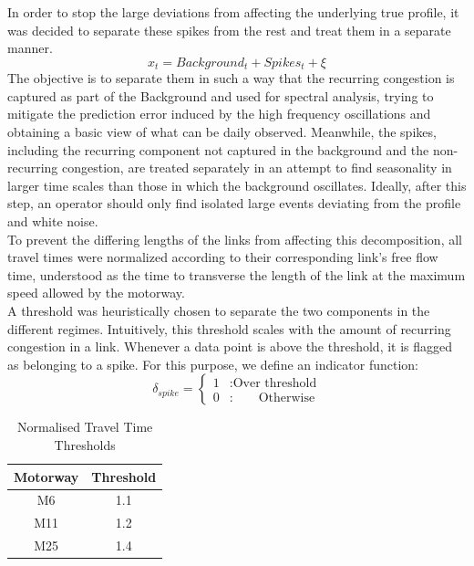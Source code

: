 \documentclass[conference]{IEEEtran}
\begin{document}
In order to stop the large deviations from affecting the underlying true profile, it was decided to separate these spikes from the rest and treat them in a separate manner.
\begin{equation}
x_t = Background_t + Spikes_t + \xi
\end{equation}
The objective is to separate them in such a way that the recurring congestion is captured as part of the Background and used for spectral analysis, trying to mitigate the prediction error induced by the high frequency oscillations and obtaining a basic view of what can be daily observed. 
Meanwhile, the spikes, including the recurring component not captured in the background and the non-recurring congestion, are treated separately in an attempt to find seasonality in larger time scales than those in which the background oscillates. 
Ideally, after this step, an operator should only find isolated large events deviating from the profile and white noise.\\

To prevent the differing lengths of the links from affecting this decomposition, all travel times were normalized according to their corresponding link's free flow time, understood as the time to transverse the length of the link at the maximum speed allowed by the motorway.\\

A threshold was heuristically chosen to separate the two components in the different regimes.
 Intuitively, this threshold scales with the amount of recurring congestion in a link. 
 Whenever a data point is above the threshold, it is flagged as belonging to a spike.
For this purpose, we define an indicator function:\\
\begin{equation}
\delta_{spike}= \left\{
\begin{array}{lr}
1 & : \textrm{Over threshold}\\
0 & : \,\,\,\,\,\,\,\,\,\,\,\,\textrm{Otherwise}
\end{array}
\right.
\label{eq:delta}
\end{equation}


\begin{table}[htbp]
	\caption{Normalised Travel Time Thresholds}
	\begin{center}
		\begin{tabular}{|c|c|}
			\hline
			\textbf{Motorway}&{\textbf{Threshold}} \\
			\hline
			M6& 1.1\\
			\hline
			M11& 1.2\\
			\hline
			M25& 1.4\\
			\hline
		\end{tabular}
		\label{tab1}
	\end{center}
\end{table}
\end{document}
